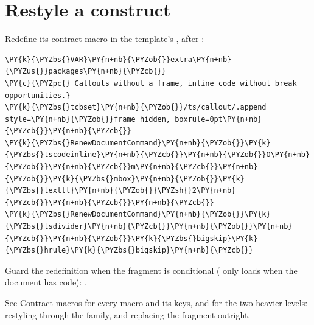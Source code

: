 \documentclass[a4paper,twoside]{article}
\begin{document}
\section{Restyle a construct}
Redefine its contract macro in the template's , after
:
\begin{tscode}[lang=latex, engine=pygments]
\begin{Verbatim}[commandchars=\\\{\},breaklines, breakanywhere, commandchars=\\\{\}]
\PY{k}{\PYZbs{}VAR}\PY{n+nb}{\PYZob{}}extra\PY{n+nb}{\PYZus{}}packages\PY{n+nb}{\PYZcb{}}
\PY{c}{\PYZpc{} Callouts without a frame, inline code without break opportunities.}
\PY{k}{\PYZbs{}tcbset}\PY{n+nb}{\PYZob{}}/ts/callout/.append style=\PY{n+nb}{\PYZob{}}frame hidden, boxrule=0pt\PY{n+nb}{\PYZcb{}}\PY{n+nb}{\PYZcb{}}
\PY{k}{\PYZbs{}RenewDocumentCommand}\PY{n+nb}{\PYZob{}}\PY{k}{\PYZbs{}tscodeinline}\PY{n+nb}{\PYZcb{}}\PY{n+nb}{\PYZob{}}O\PY{n+nb}{\PYZob{}}\PY{n+nb}{\PYZcb{}}m\PY{n+nb}{\PYZcb{}}\PY{n+nb}{\PYZob{}}\PY{k}{\PYZbs{}mbox}\PY{n+nb}{\PYZob{}}\PY{k}{\PYZbs{}texttt}\PY{n+nb}{\PYZob{}}\PYZsh{}2\PY{n+nb}{\PYZcb{}}\PY{n+nb}{\PYZcb{}}\PY{n+nb}{\PYZcb{}}
\PY{k}{\PYZbs{}RenewDocumentCommand}\PY{n+nb}{\PYZob{}}\PY{k}{\PYZbs{}tsdivider}\PY{n+nb}{\PYZcb{}}\PY{n+nb}{\PYZob{}}\PY{n+nb}{\PYZcb{}}\PY{n+nb}{\PYZob{}}\PY{k}{\PYZbs{}bigskip}\PY{k}{\PYZbs{}hrule}\PY{k}{\PYZbs{}bigskip}\PY{n+nb}{\PYZcb{}}
\end{Verbatim}
\end{tscode}
Guard the redefinition when the fragment is conditional ( only loads
when the document has code): .

See Contract macros for every macro and its keys, and for the
two heavier levels: restyling through the  family, and replacing the
fragment outright.
\end{document}

